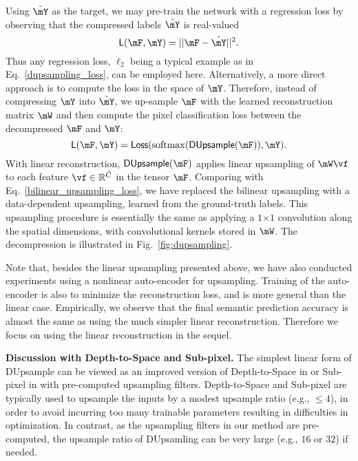 \documentclass[10pt,twocolumn,letterpaper]{article}
\def\softmax{{\rm softmax}}
\def\Loss{{\sf Loss}}
\def\Real{{\mathbb R}}
\newcommand{\1}{{\mathbbm{1}}}
\begin{document}
Using $\tilde{\mY}$ as the target,
we may pre-train the network with a regression loss by observing that
the compressed labels $ \tilde \mY $ is real-valued
\begin{equation} \label{dupsampling_loss}
{\sf L}( \mF, \mY) = ||\mF - \tilde{\mY}||^2.
\end{equation}
Thus any regression loss, $ \ell_2 $ being a typical example as in Eq.~\eqref{dupsampling_loss},    can be employed here.
Alternatively,
a more direct approach is to
compute the loss in the space of $\mY$. Therefore, instead of compressing $\mY$ into $\tilde{\mY}$, we up-sample $\mF$  with the learned reconstruction  matrix $ \mW   $   and then compute the pixel classification loss between the decompressed $\mF$ and $\mY$:
\begin{equation} \label{dupsampling_dual_loss}
{\sf L}(\mF, \mY) = \Loss(\softmax( {\sf DUpsample} ( \mF )  ), \mY).
\end{equation}
With linear reconstruction, $ {\sf DUpsample} ( \mF )$  applies linear upsampling of $ \mW \vf   $ to each feature $ \vf \in \Real^{ \tilde{C}} $ in the tensor $ \mF $.
Comparing with Eq.~\eqref{bilinear_upsampling_loss},
we have replaced the bilinear upsampling with a data-dependent upsampling, learned from the ground-truth labels.
This upsampling procedure is essentially the same as applying a $ 1$$\times$$ 1$ convolution
along the spatial dimensions, with convolutional kernels stored in $ \mW $.
The decompression is illustrated in Fig.~\ref{fig:dupsampling}.



















Note that, besides the linear upsampling presented above, we have also
conducted experiments using a nonlinear auto-encoder for upsampling.
Training of the auto-encoder is also to minimize the reconstruction loss,
and is  more general than the linear case. Empirically,
we observe that the final semantic prediction accuracy is almost the same
as using the much simpler linear reconstruction. Therefore we
focus on using the linear reconstruction in the sequel.

\textbf{Discussion with Depth-to-Space and Sub-pixel.} The simplest linear form of DUpsample can be viewed as an improved version of Depth-to-Space in \cite{wojna2017devil} or Sub-pixel in \cite{shi2016real} with pre-computed upsampling filters.
Depth-to-Space and Sub-pixel are typically used to upsample the inputs by a modest upsample ratio (e.g., $\leq 4$), in order to avoid incurring too many trainable parameters resulting in difficulties in optimization.
In contrast, as the upsampling filters in our method are pre-computed, the upsample ratio of DUpsamling can be very large (e.g., $16$ or $32$) if needed.
\end{document}
